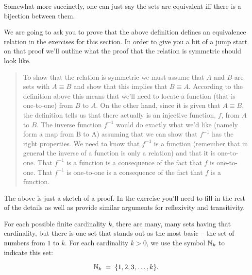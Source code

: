Somewhat more succinctly, one can just say the sets are equivalent iff
there is a bijection between them.

We are going to ask you to prove that the above definition defines an
equivalence relation in the exercises for this section. In order to give you a
bit of a jump start on that proof we'll outline what the proof that the relation
is symmetric should look like.

\begin{quote}
To show that the relation is symmetric we must assume that $A$
and $B$ are sets with $A \equiv B$ and show that this implies that
$B \equiv A$. According to the definition above this means that we'll
need to locate a function (that is one-to-one) from $B$ to $A$. On
the other hand, since it is given that $A \equiv B$, the definition tells
us that there actually is an injective function, $f$, from $A$ to $B$.
The inverse function $f^{-1}$ would do exactly what we'd like (namely
form a map from B to A) assuming that we can show that $f^{-1}$
has the right properties. We need to know that $f^{-1}$ is a function
(remember that in general the inverse of a function is only a
relation) and that it is one-to-one. That $f^{-1}$ is a function is a
consequence of the fact that $f$ is one-to-one. That $f^{-1}$ is one-to-one
is a consequence of the fact that $f$ is a function.
\end{quote}

The above is just a sketch of a proof. In the exercise you'll need to fill
in the rest of the details as well as provide similar arguments for reflexivity
and transitivity.

For each possible finite cardinality $k$, there are many, many sets having
that cardinality, but there is one set that stands out as the most basic -- the
set of numbers from $1$ to $k$. For each cardinality $k > 0$, we use the symbol
${\mathbb N}_k$ to indicate this set:

\[ {\mathbb N}_k \; = \; \{1, 2, 3, \ldots , k\}. \]

